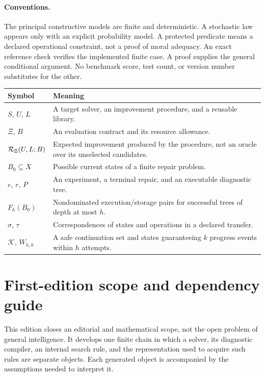 \documentclass[11pt,letterpaper]{article}
\theoremstyle{plain}
\theoremstyle{definition}
\begin{document}
\paragraph{Conventions.}
The principal constructive models are finite and deterministic. A stochastic law appears only with an explicit probability model. A protected predicate means a declared operational constraint, not a proof of moral adequacy. An exact reference check verifies the implemented finite case. A proof supplies the general conditional argument. No benchmark score, test count, or version number substitutes for the other.

\begin{center}\small
\begin{tabularx}{\textwidth}{@{}lX@{}}\toprule
Symbol & Meaning\\\midrule
$S$, $U$, $L$ & A target solver, an improvement procedure, and a reusable library.\\
$\Xi$, $B$ & An evaluation contract and its resource allowance.\\
$\mathcal R_\Xi(U,L;B)$ & Expected improvement produced by the procedure, not an oracle over its unselected candidates.\\
$B_0\subseteq X$ & Possible current states of a finite repair problem.\\
$e$, $r$, $P$ & An experiment, a terminal repair, and an executable diagnostic tree.\\
$F_h(B_0)$ & Nondominated execution/storage pairs for successful trees of depth at most $h$.\\
$\sigma$, $\tau$ & Correspondences of states and operations in a declared transfer.\\
$\mathcal K$, $W_{h,k}$ & A safe continuation set and states guaranteeing $k$ progress events within $h$ attempts.\\\bottomrule
\end{tabularx}\end{center}
\clearpage
\section*{First-edition scope and dependency guide}
This edition closes an editorial and mathematical scope, not the open problem of general intelligence. It develops one finite chain in which a solver, its diagnostic compiler, an internal search rule, and the representation used to acquire such rules are separate objects. Each generated object is accompanied by the assumptions needed to interpret it.
\end{document}
